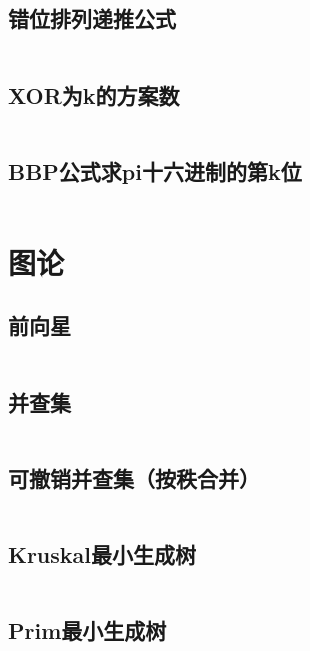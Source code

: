 \inputminted{text}{code/colorPolynomial.txt}

\subsection{错位排列递推公式} 

\inputminted{cpp}{code/derangements.cc}

\subsection{	XOR为k的方案数} 

\inputminted{cpp}{code/XOR为k的方案数.cc}

\subsection{BBP公式求pi十六进制的第k位} 

\inputminted{cpp}{code/BBP.cc}

\section{图论} 
\subsection{前向星} 

\inputminted{cpp}{code/PriorStar.cc}

\subsection{并查集} 

\inputminted{text}{code/union-find.cc }

\subsection{可撤销并查集（按秩合并）} 

\inputminted{cpp}{code/union-find(undo).cc}

\subsection{Kruskal最小生成树} 

\inputminted{cpp}{code/Kruskal.cc}

\subsection{Prim最小生成树} 

